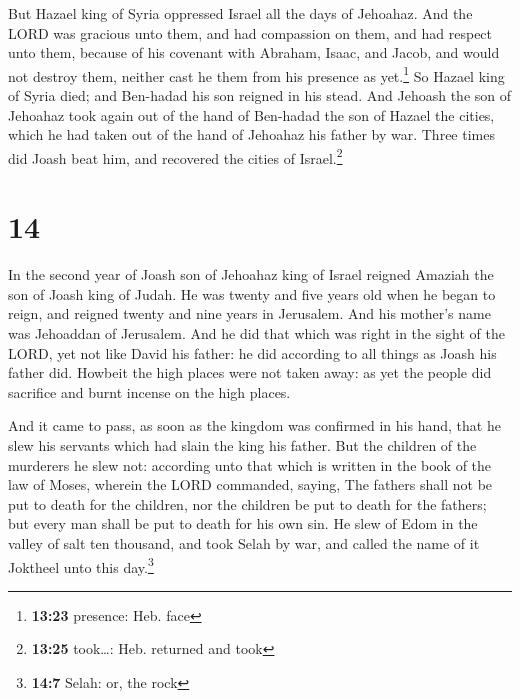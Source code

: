  But Hazael king of Syria oppressed Israel all the days
of Jehoahaz.  And the LORD was gracious unto them, and
had compassion on them, and had respect unto them, because of his
covenant with Abraham, Isaac, and Jacob, and would not destroy them,
neither cast he them from his presence as yet.\footnote{\textbf{13:23}
  presence: Heb. face}  So Hazael king of Syria died; and
Ben-hadad his son reigned in his stead.  And Jehoash the
son of Jehoahaz took again out of the hand of Ben-hadad the son of
Hazael the cities, which he had taken out of the hand of Jehoahaz his
father by war. Three times did Joash beat him, and recovered the cities
of Israel.\footnote{\textbf{13:25} took\ldots: Heb. returned and took}

\hypertarget{section-13}{%
\section{14}\label{section-13}}

 In the second year of Joash son of Jehoahaz king of
Israel reigned Amaziah the son of Joash king of Judah.  He
was twenty and five years old when he began to reign, and reigned twenty
and nine years in Jerusalem. And his mother's name was Jehoaddan of
Jerusalem.  And he did that which was right in the sight
of the LORD, yet not like David his father: he did according to all
things as Joash his father did.  Howbeit the high places
were not taken away: as yet the people did sacrifice and burnt incense
on the high places.

 And it came to pass, as soon as the kingdom was confirmed
in his hand, that he slew his servants which had slain the king his
father.  But the children of the murderers he slew not:
according unto that which is written in the book of the law of Moses,
wherein the LORD commanded, saying, The fathers shall not be put to
death for the children, nor the children be put to death for the
fathers; but every man shall be put to death for his own sin.
 He slew of Edom in the valley of salt ten thousand, and
took Selah by war, and called the name of it Joktheel unto this
day.\footnote{\textbf{14:7} Selah: or, the rock}

